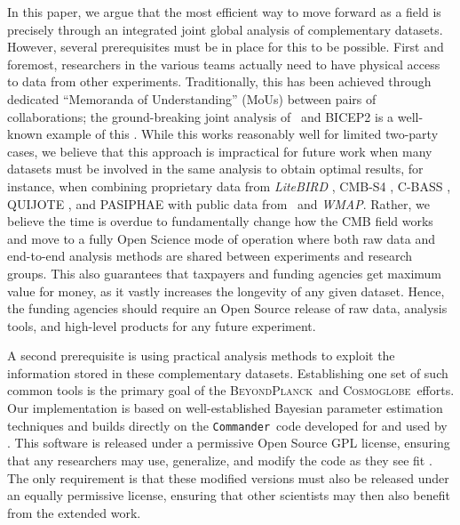 \documentclass[twocolumn]{aa}
\def\WMAP{\textit{WMAP}}
\def\commander{\texttt{Commander}}
\newcommand{\BP}{\textsc{BeyondPlanck}}
\newcommand{\cosmoglobe}{\textsc{Cosmoglobe}}
\begin{document}
In this paper, we argue that the most efficient way to move forward as a field is precisely through an integrated joint global analysis of complementary datasets. However, several prerequisites must be in place for this to be possible. First and foremost, researchers in the various teams actually need to have physical access to data from other experiments. Traditionally, this has been achieved through dedicated ``Memoranda of Understanding'' (MoUs) between pairs of collaborations; the ground-breaking joint analysis of \Planck\ and BICEP2 is a well-known example of this \citep{pb2015}. While this works reasonably well for limited two-party cases, we believe that this approach is impractical for future work when many datasets must be involved in the same analysis to obtain optimal results, for instance, when combining proprietary data from \textit{LiteBIRD} \citep{litebird2020}, CMB-S4 \citep{cmbS4}, C-BASS \citep{cbass18}, QUIJOTE \citep{QUIJOTE_I_2015}, and PASIPHAE \citep{tassis:2018} with public data from \Planck\ and \WMAP. Rather, we believe the time is overdue to fundamentally change how the CMB field works and move to a fully Open Science mode of operation where both raw data and end-to-end analysis methods are shared between experiments and research groups. This also guarantees that taxpayers and funding agencies get maximum value for money, as it vastly increases the longevity of any given dataset. Hence, the funding agencies should require an Open Source release of raw data, analysis tools, and high-level products for any future experiment.

A second prerequisite is using practical analysis methods to exploit the information stored in these complementary datasets. Establishing one set of such common tools is the primary goal of the \BP\ and \cosmoglobe\ efforts. Our implementation is based on well-established Bayesian parameter estimation techniques and builds directly on the \commander\ code developed for and used by \Planck. This software is released under a permissive Open Source GPL license, ensuring that any researchers may use, generalize, and modify the code as they see fit \citep{bp01,BP03}. The only requirement is that these modified versions must also be released under an equally permissive license, ensuring that other scientists may then also benefit from the extended work. 
\end{document}
